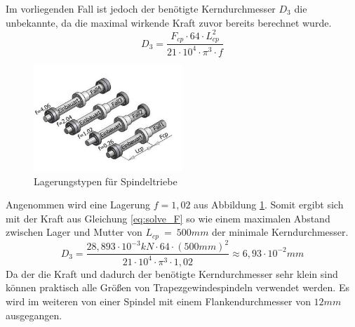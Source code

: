 \begin{enumerate}[label=(\alph*)]
    Im vorliegenden Fall ist jedoch der benötigte Kerndurchmesser $D_3$ die unbekannte, da die maximal wirkende Kraft zuvor bereits berechnet wurde. 
    \begin{equation}
        D_3 = \frac{F_{cp}\cdot 64 \cdot L_{cp}^2}{21\cdot 10^4 \cdot \pi^3 \cdot f}
    \end{equation}
    \begin{figure}[!h]
        \centering
        \includegraphics[width=0.5\textwidth]{Abbildungen/Lagerungstyp.png}
        \caption{Lagerungstypen für Spindeltriebe \cite{DOLDMechatronikGmbH.}}
        \label{fig:lagerung_knick}
    \end{figure}

    Angenommen wird eine Lagerung $f=1,02$ aus Abbildung \ref{fig:lagerung_knick}. Somit ergibt sich mit der Kraft aus Gleichung \ref{eq:solve_F} so wie einem maximalen Abstand zwischen Lager und Mutter von $L_{cp}~=~500mm$ der minimale Kerndurchmesser.
    \begin{equation}
        D_3 = \frac{28,893\cdot10^{-3}kN\cdot 64 \cdot (500mm)^2}{21\cdot 10^4 \cdot \pi^3 \cdot 1,02} \approx 6,93\cdot10^{-2} mm
    \end{equation}
    Da der die Kraft und dadurch der benötigte Kerndurchmesser sehr klein sind können praktisch alle Größen von Trapezgewindespindeln verwendet werden. Es wird im weiteren von einer Spindel mit einem Flankendurchmesser von $12mm$ ausgegangen.


\end{enumerate}
